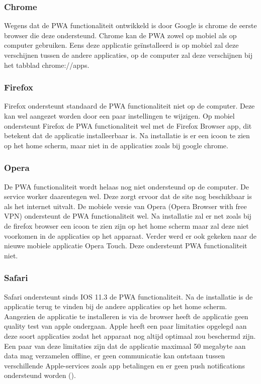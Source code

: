 \subsubsection{Chrome}
Wegens dat de PWA functionaliteit ontwikkeld is door Google is chrome de eerste browser die deze ondersteund. Chrome kan de PWA zowel op mobiel als op computer gebruiken. Eens deze applicatie geïnstalleerd is op mobiel zal deze verschijnen tussen de andere applicaties, op de computer zal deze verschijnen bij het tabblad chrome://apps.

\subsubsection{Firefox}
Firefox ondersteunt standaard de PWA functionaliteit niet op de computer. Deze kan wel aangezet worden door een paar instellingen te wijzigen.
Op mobiel ondersteunt Firefox de PWA functionaliteit wel met de Firefox Browser app, dit betekent dat de applicatie installeerbaar is. Na installatie is er een icoon te zien op het home scherm, maar niet in de applicaties zoals bij google chrome.

\subsubsection{Opera}
De PWA functionaliteit wordt helaas nog niet ondersteund op de computer. De service worker daarentegen wel. Deze zorgt ervoor dat de site nog beschikbaar is als het internet uitvalt. 
De mobiele versie van Opera (Opera Browser with free VPN) ondersteunt de PWA functionaliteit wel. Na installatie zal er net zoals bij de firefox browser een icoon te zien zijn op het home scherm maar zal deze niet voorkomen in de applicaties op het apparaat.
Verder werd er ook gekeken naar de nieuwe mobiele applicatie Opera Touch. Deze ondersteunt PWA functionaliteit niet.

\subsubsection{Safari}
Safari ondersteunt sinds IOS 11.3 de PWA functionaliteit. Na de installatie is de applicatie terug te vinden bij de andere applicaties op het home scherm. Aangezien de applicatie te installeren is via de browser heeft de applicatie geen quality test van apple ondergaan. Apple heeft een paar limitaties opgelegd aan deze soort applicaties zodat het apparaat nog altijd optimaal zou beschermd zijn. Een paar van deze limitaties zijn dat de applicatie maximaal 50 megabyte aan data mag verzamelen offline, er geen communicatie kan ontstaan tussen verschillende Apple-services zoals app betalingen en er geen push notifications ondersteund worden (\cite{BROWSERSUPPORT_IOS}).

